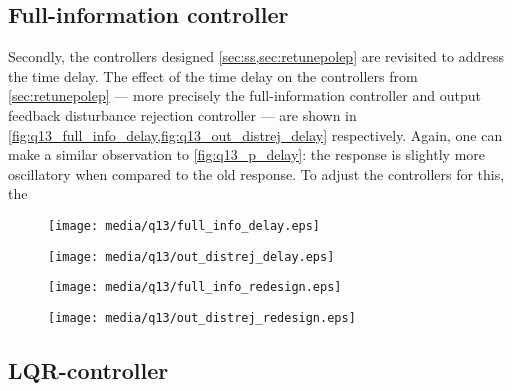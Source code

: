 \subsection{Full-information controller}
Secondly, the controllers designed \cref{sec:ss,sec:retunepolep} are revisited to address the time delay. The effect of the time delay on the controllers from \cref{sec:retunepolep} --- more precisely the full-information controller and output feedback disturbance rejection controller --- are shown in \cref{fig:q13_full_info_delay,fig:q13_out_distrej_delay} respectively. Again, one can make a similar observation to \cref{fig:q13_p_delay}: the response is slightly more oscillatory when compared to the old response. To adjust the controllers for this, the
\begin{figure}[ht]
    \centering
    \texttt{[image: media/q13/full\_info\_delay.eps]}
    \caption{}
    \label{fig:q13_full_info_delay}
\end{figure}
\begin{figure}[ht]
    \centering
    \texttt{[image: media/q13/out\_distrej\_delay.eps]}
    \caption{}
    \label{fig:q13_out_distrej_delay}
\end{figure}
\begin{figure}[ht]
    \centering
    \texttt{[image: media/q13/full\_info\_redesign.eps]}
    \caption{}
    \label{fig:q13_full_info_redesign}
\end{figure}
\begin{figure}[ht]
    \centering
    \texttt{[image: media/q13/out\_distrej\_redesign.eps]}
    \caption{}
    \label{fig:q13_out_distrej_redesign}
\end{figure}

\FloatBarrier
\subsection{LQR-controller}